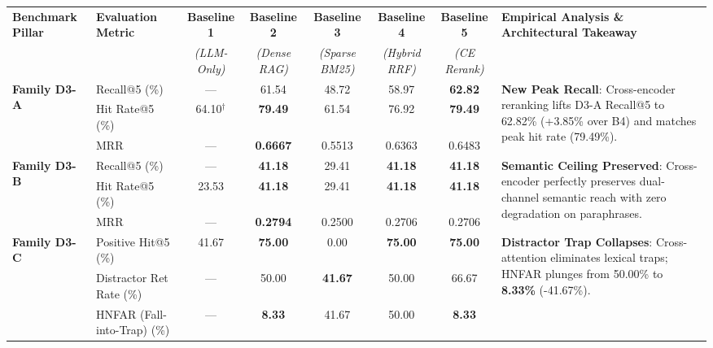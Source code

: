 \vspace{1em}

\begin{table}[t]
\centering
\small
\begin{tabular}{llcccccp{4.2cm}}
\toprule
\textbf{Benchmark Pillar} & \textbf{Evaluation Metric} & \textbf{Baseline 1} & \textbf{Baseline 2} & \textbf{Baseline 3} & \textbf{Baseline 4} & \textbf{Baseline 5} & \textbf{Empirical Analysis \& Architectural Takeaway} \\
& & \textit{(LLM-Only)} & \textit{(Dense RAG)} & \textit{(Sparse BM25)} & \textit{(Hybrid RRF)} & \textit{(CE Rerank)} & \\
\midrule
\multirow{3}{*}{\textbf{Family D3-A}} & Recall@5 (\%) & --- & 61.54 & 48.72 & 58.97 & \textbf{62.82} & \multirow{3}{4.2cm}{\textbf{New Peak Recall}: Cross-encoder reranking lifts D3-A Recall@5 to 62.82\% (+3.85\% over B4) and matches peak hit rate (79.49\%).} \\
\textit{Statutory Lookup} & Hit Rate@5 (\%) & 64.10$^\dagger$ & \textbf{79.49} & 61.54 & 76.92 & \textbf{79.49} & \\
($N = 39$) & MRR & --- & \textbf{0.6667} & 0.5513 & 0.6363 & 0.6483 & \\
\midrule
\multirow{3}{*}{\textbf{Family D3-B}} & Recall@5 (\%) & --- & \textbf{41.18} & 29.41 & \textbf{41.18} & \textbf{41.18} & \multirow{3}{4.2cm}{\textbf{Semantic Ceiling Preserved}: Cross-encoder perfectly preserves dual-channel semantic reach with zero degradation on paraphrases.} \\
\textit{Semantic Concepts} & Hit Rate@5 (\%) & 23.53 & \textbf{41.18} & 29.41 & \textbf{41.18} & \textbf{41.18} & \\
($N = 17$) & MRR & --- & \textbf{0.2794} & 0.2500 & 0.2706 & 0.2706 & \\
\midrule
\multirow{3}{*}{\textbf{Family D3-C}} & Positive Hit@5 (\%) & 41.67 & \textbf{75.00} & 0.00 & \textbf{75.00} & \textbf{75.00} & \multirow{3}{4.2cm}{\textbf{Distractor Trap Collapses}: Cross-attention eliminates lexical traps; HNFAR plunges from 50.00\% to \textbf{8.33\%} (-41.67\%).} \\
\textit{Hard Negatives} & Distractor Ret Rate (\%) & --- & 50.00 & \textbf{41.67} & 50.00 & 66.67 & \\
($N = 12$) & HNFAR (Fall-into-Trap) (\%) & --- & \textbf{8.33} & 41.67 & 50.00 & \textbf{8.33} & \\

\end{tabular}
\end{table}
